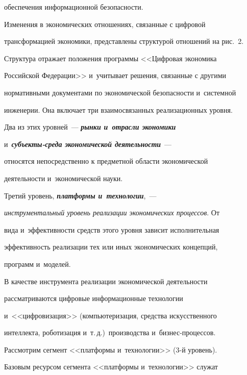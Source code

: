 обеспечения информационной безопасности.

  

  Изменения в экономических отношениях, связанные с цифровой 

трансформацией экономики, представлены структурой отношений на рис.~2. 

  



  

  Структура отражает положения программы <<Цифровая экономика 

Российской Федерации>> и~учитывает решения, связанные с другими 

нормативными документами по экономической безопасности и~системной 

инженерии. Она включает три взаимосвязанных реализационных уровня.

  

  Два из этих уровней~--- {\bfseries\textit{рынки и~отрасли экономики}} 

и~{\bfseries\textit{субъекты-среда экономической деятельности}}~--- 

относятся непосредственно к предметной области экономической 

деятельности и~экономической науки. 

  

  Третий уровень, {\bfseries\textit{платформы и~технологии}},~--- 

\textit{инструментальный уровень реализации экономических процессов}. От 

вида и~эффективности средств этого уровня зависит исполнительная 

эффективность реализации тех или иных экономических концепций, 

программ и~моделей. 

  

  В качестве инструмента реализации экономической деятельности 

рассматриваются цифровые информационные технологии 

и~<<цифровизация>> (компьютеризация, средства искусственного 

интеллекта, роботизация и~т.\,д.)\ производства и~биз\-нес-про\-цес\-сов. 

  

  Рассмотрим сегмент <<платформы и~технологии>> (3-й уровень). 

  

  Базовым ресурсом сегмента <<платформы и~технологии>> служат 

